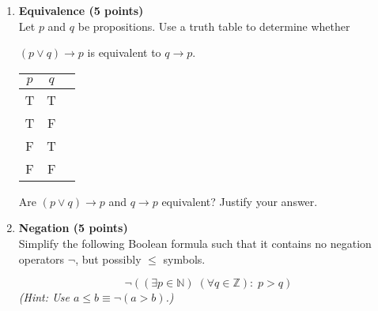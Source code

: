 \documentclass[11pt]{article}
\def\sectionOneA#1{}
\def\sectionOneB#1{}
\def\sectionTwoA#1{}
\def\sectionTwoB#1{}
\def\sectionVicsection#1{#1}
\begin{document}
\begin{enumerate}
\item {\bf Equivalence (5 points)}\\
  Let $p$ and $q$ be propositions. Use a truth table to determine whether
  
  \sectionOneA{$\neg (p\rightarrow q)$ is equivalent to $p\wedge \neg q$.}
  \sectionOneB{$p\wedge \neg q$ is equivalent to $\neg (p\rightarrow q)$.} %
  \sectionTwoA{$\neg (p\rightarrow \neg q)$ is equivalent to $p\wedge q$.}
  \sectionTwoB{$p\wedge q$ is equivalent to $\neg (p\rightarrow \neg q)$.} %
  \sectionVicsection{$(p\vee q) \to p$ is equivalent to $q\to p$.}
  

\begin{center}
{\Large
\begin{tabular}{|c|c|c}
    $p$ & $q$ & \hspace*{7cm}\\\hline
T&T&\\
T&F&\\
F&T&\\
F&F&\\
\end{tabular}
}
\end{center}

\vspace*{2ex}
Are  $(p \vee q) \to p$ and $q \to p$ equivalent? Justify your answer.
\vspace*{2cm}

\item {\bf Negation (5 points)}\\

Simplify the following Boolean formula such that it contains
no negation operators $\neg$, but possibly $\leq$ symbols.
%
\sectionOneA{{\Large $$\neg\exists x \;\forall y \;\exists z:\; (x=y\;\wedge\; y=z)$$}}
\sectionOneB{{\Large $$\neg\forall x \;\exists y \;\forall z:\; (x=y\;\wedge\; y=z)$$}} %
\sectionTwoA{{{\Large $$\neg \forall p \;\forall q:\; ((p\vee q)\rightarrow q)$$}} {\em\normalsize (Hint: Use $a\rightarrow b \equiv \neg  a\vee b$)} }
\sectionTwoB{{{\Large $$\neg \exists p \;\exists q:\; ((p\vee q)\rightarrow q)$$}} {\em\normalsize (Hint: Use $a\rightarrow b \equiv \neg  a\vee b$)} } %
\sectionVicsection{{{\Large $$\neg \left((\exists p \in \mathbb{N}) \;(\forall q \in \mathbb{Z}):\; p>q \right) $$}} {\em\normalsize (Hint: Use $a\leq b \equiv \neg(a >b)$.)} 
}


\end{enumerate}
\end{document}
